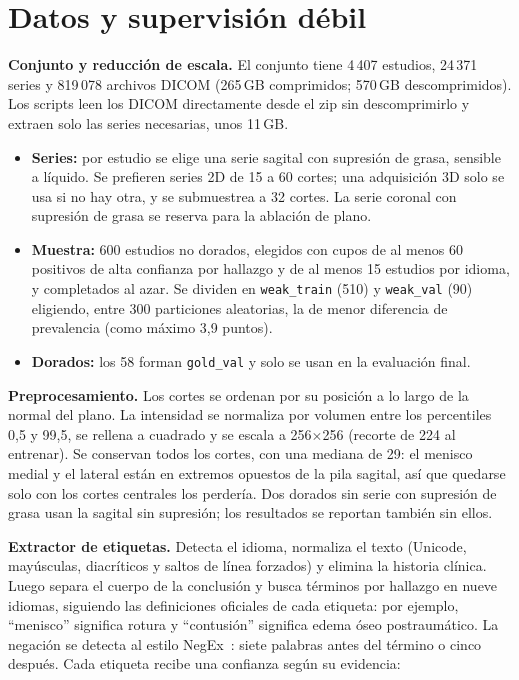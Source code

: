 \section{Datos y supervisión débil}
\label{sec:datos}

\textbf{Conjunto y reducción de escala.} El conjunto tiene 4\,407 estudios, 24\,371 series y
819\,078 archivos DICOM (265\,GB comprimidos; 570\,GB descomprimidos). Los scripts leen los
DICOM directamente desde el zip sin descomprimirlo y extraen solo las series necesarias,
unos 11\,GB.
\begin{itemize}
  \item \textbf{Series:} por estudio se elige una serie sagital con supresión de grasa,
        sensible a líquido. Se prefieren series 2D de 15 a 60 cortes; una adquisición 3D solo
        se usa si no hay otra, y se submuestrea a 32 cortes. La serie coronal con supresión
        de grasa se reserva para la ablación de plano.
  \item \textbf{Muestra:} 600 estudios no dorados, elegidos con cupos de al menos 60
        positivos de alta confianza por hallazgo y de al menos 15 estudios por idioma, y
        completados al azar. Se dividen en \texttt{weak\_train} (510) y \texttt{weak\_val}
        (90) eligiendo, entre 300 particiones aleatorias, la de menor diferencia de
        prevalencia (como máximo 3,9 puntos).
  \item \textbf{Dorados:} los 58 forman \texttt{gold\_val} y solo se usan en la evaluación
        final.
\end{itemize}

\textbf{Preprocesamiento.} Los cortes se ordenan por su posición a lo largo de la normal del
plano. La intensidad se normaliza por volumen entre los percentiles 0,5 y 99,5, se rellena a
cuadrado y se escala a 256$\times$256 (recorte de 224 al entrenar). Se conservan todos los
cortes, con una mediana de 29: el menisco medial y el lateral están en extremos opuestos de
la pila sagital, así que quedarse solo con los cortes centrales los perdería. Dos dorados sin
serie con supresión de grasa usan la sagital sin supresión; los resultados se reportan también
sin ellos.

\textbf{Extractor de etiquetas.} Detecta el idioma, normaliza el texto (Unicode, mayúsculas,
diacríticos y saltos de línea forzados) y elimina la historia clínica. Luego separa el cuerpo
de la conclusión y busca términos por hallazgo en nueve idiomas, siguiendo las definiciones
oficiales de cada etiqueta: por ejemplo, ``menisco'' significa rotura y ``contusión'' significa
edema óseo postraumático. La negación se detecta al estilo NegEx~\citep{chapman2001negex}:
siete palabras antes del término o cinco después. Cada etiqueta recibe una confianza según
su evidencia:

